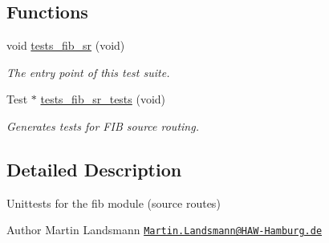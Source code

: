 \subsection*{Functions}
\begin{DoxyCompactItemize}
\item 
void \hyperlink{group__unittests_ga81367a9f08a307f54d685b422cf97f3d}{tests\+\_\+fib\+\_\+sr} (void)
\begin{DoxyCompactList}\small\item\em The entry point of this test suite. \end{DoxyCompactList}\item 
Test $\ast$ \hyperlink{group__unittests_ga61dfd0327d9f733fa863525f836b9c33}{tests\+\_\+fib\+\_\+sr\+\_\+tests} (void)
\begin{DoxyCompactList}\small\item\em Generates tests for F\+IB source routing. \end{DoxyCompactList}\end{DoxyCompactItemize}


\subsection{Detailed Description}
Unittests for the {\ttfamily fib} module (source routes) 

\begin{DoxyAuthor}{Author}
Martin Landsmann \href{mailto:Martin.Landsmann@HAW-Hamburg.de}{\tt Martin.\+Landsmann@\+H\+A\+W-\/\+Hamburg.\+de} 
\end{DoxyAuthor}
